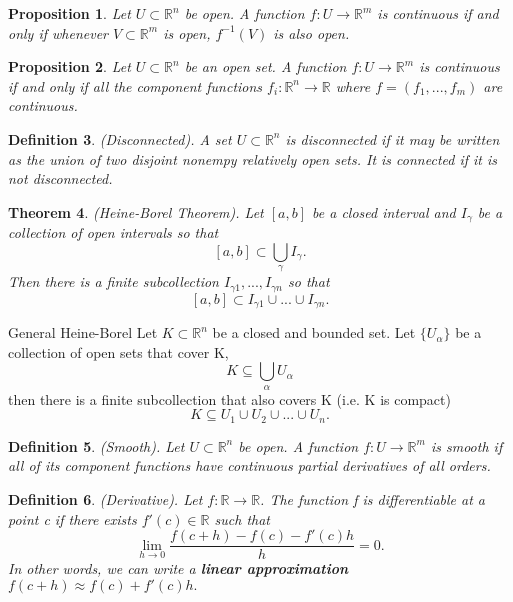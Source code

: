 \documentclass[twoside]{article}
\newcounter{lecnum}
\newtheorem{theorem}{Theorem}[lecnum]
\newtheorem{proposition}[theorem]{Proposition}
\newtheorem{definition}[theorem]{Definition}
\begin{document}
\begin{proposition}Let $U \subset \mathbb{R}^n$ be open. A function $f: U \rightarrow \mathbb{R}^m$ is continuous if and only if whenever $V \subset \mathbb{R}^m$ is open, $f^{-1}(V)$ is also open.
\end{proposition}

\begin{proposition}Let $U \subset \mathbb{R}^n$ be an open set. A function $f: U \rightarrow \mathbb{R}^m$ is continuous if and only if all the component functions $f_i: \mathbb{R}^n \rightarrow \mathbb{R}$ where $f = (f_1,...,f_m)$ are continuous.
\end{proposition}

\begin{definition}(Disconnected). A set $U \subset \mathbb{R}^n$ is disconnected if it may be written as the union of two disjoint nonempy relatively open sets. It is connected if it is not disconnected.
\end{definition}

\begin{theorem}(Heine-Borel Theorem). Let $[a,b]$ be a closed interval and $I_{\gamma}$ be a collection of open intervals so that $$[a,b] \subset \bigcup_{\gamma}I_{\gamma}.$$ Then there is a finite subcollection $I_{\gamma 1}, ..., I_{\gamma n}$ so that 
$$
[a,b] \subset I_{\gamma 1} \cup ... \cup I_{\gamma n}.
$$
\end{theorem}

\begin{theorem_exam}{General Heine-Borel}{} Let $K \subset \mathbb{R}^n$ be a closed and bounded set. Let $\{U_{\alpha}\}$ be a collection of open sets that cover K,
$$
K \subseteq \bigcup_{\alpha}U_{\alpha}
$$
then there is a finite subcollection that also covers K (i.e. K is compact)
$$
K \subseteq U_1 \cup U_2 \cup ... \cup U_n.
$$
\end{theorem_exam}


\begin{definition}(Smooth). Let $U \subset \mathbb{R}^n$ be open. A function $f: U \rightarrow \mathbb{R}^m$ is smooth if all of its component functions have continuous partial derivatives of all orders.
\end{definition}

\begin{definition}(Derivative). Let $f: \mathbb{R} \rightarrow \mathbb{R}$. The function f is differentiable at a point c if there exists $f'(c) \in \mathbb{R}$ such that 
$$
\lim_{h \rightarrow 0}\frac{f(c+h) - f(c) - f'(c)h}{h} = 0.
$$
In other words, we can write a \textbf{linear approximation} $f(c+h) \approx f(c) + f'(c)h.$
\end{definition}
\end{document}
